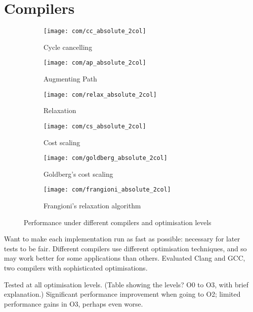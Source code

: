 \section{Compilers}

\begin{figure}
    \begin{widepage}
    \begin{subfigure}[c]{0.5\textwidth}
        \texttt{[image: com/cc\_absolute\_2col]}
        \caption{Cycle cancelling}
    \end{subfigure}
    \begin{subfigure}[c]{0.5\textwidth}
        \texttt{[image: com/ap\_absolute\_2col]}
        \caption{Augmenting Path}
    \end{subfigure}
    \begin{subfigure}[c]{0.5\textwidth}
        \texttt{[image: com/relax\_absolute\_2col]}
        \caption{Relaxation}
    \end{subfigure}
    \begin{subfigure}[c]{0.5\textwidth}
        \texttt{[image: com/cs\_absolute\_2col]}
        \caption{Cost scaling}
    \end{subfigure}
    \begin{subfigure}[c]{0.5\textwidth}
        \texttt{[image: com/goldberg\_absolute\_2col]}
        \caption{Goldberg's cost scaling}
    \end{subfigure}
    \begin{subfigure}[c]{0.5\textwidth}
        \texttt{[image: com/frangioni\_absolute\_2col]}
        \caption{Frangioni's relaxation algorithm}
    \end{subfigure}
    \end{widepage}
    \caption{Performance under different compilers and optimisation levels}
    \label{fig:compilers}
\end{figure}

Want to make each implementation run as fast as possible: necessary for later tests to be fair. Different compilers use different optimisation techniques, and so may work better for some applications than others. Evaluated Clang and GCC, two compilers with sophisticated optimisations.

Tested at all optimisation levels. (Table showing the levels? O0 to O3, with brief explanation.) Significant performance improvement when going to O2; limited performance gains in O3, perhaps even worse.

